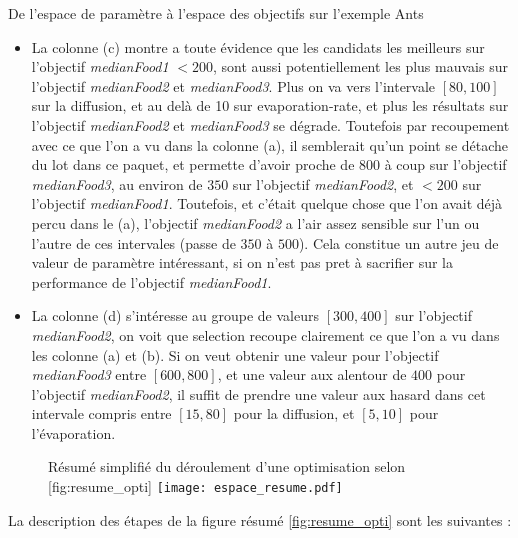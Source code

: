 \begin{testiv}{De l'espace de paramètre à l'espace des objectifs sur l'exemple Ants }{}
\begin{itemize}[nolistsep]
	\item La colonne (c) montre a toute évidence que les candidats les meilleurs sur l'objectif \textit{medianFood1} $< 200$, sont aussi potentiellement les plus mauvais sur l'objectif \textit{medianFood2} et \textit{medianFood3}. Plus on va vers l'intervale $[80, 100]$ sur la diffusion, et au delà de 10 sur evaporation-rate, et plus les résultats sur l'objectif \textit{medianFood2} et \textit{medianFood3} se dégrade. Toutefois par recoupement avec ce que l'on a vu dans la colonne (a), il semblerait qu'un point se détache du lot dans ce paquet, et permette d'avoir proche de $800$ à coup sur l'objectif \textit{medianFood3}, au environ de $350$ sur l'objectif \textit{medianFood2}, et $ < 200$ sur l'objectif \textit{medianFood1}. Toutefois, et c'était quelque chose que l'on avait déjà percu dans le (a), l'objectif \textit{medianFood2} a l'air assez sensible sur l'un ou l'autre de ces intervales (passe de $350$ à $500$). Cela constitue un autre jeu de valeur de paramètre intéressant, si on n'est pas pret à sacrifier sur la performance de l'objectif \textit{medianFood1}.
	\item La colonne (d) s'intéresse au groupe de valeurs $[300, 400]$ sur l'objectif  \textit{medianFood2}, on voit que selection recoupe clairement ce que l'on a vu dans les colonne (a) et (b). Si on veut obtenir une valeur pour l'objectif \textit{medianFood3} entre $[600, 800]$, et une valeur aux alentour de $400$ pour l'objectif \textit{medianFood2}, il suffit de prendre une valeur aux hasard dans cet intervale compris entre $[15, 80]$  pour la diffusion, et $[5, 10]$ pour l'évaporation.
\end{itemize}

\end{testiv}


\begin{figure}[!ht]
	\begin{sidecaption}[fortoc]{Résumé simplifié du déroulement d'une optimisation selon \textcite[109]{Weise2011}}[fig:resume_opti]
		\centering
		\texttt{[image: espace\_resume.pdf]}{
		}
  \end{sidecaption}
\end{figure}

La description des étapes de la figure résumé \ref{fig:resume_opti} sont les suivantes :

